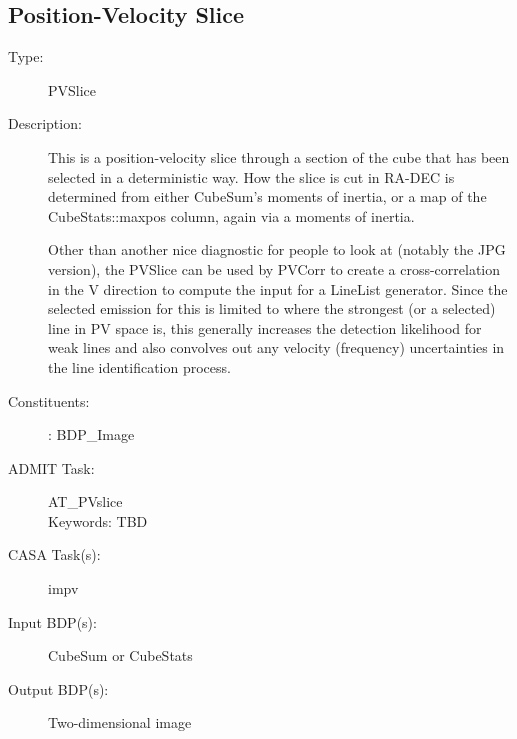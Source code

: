 \subsection{Position-Velocity Slice}
\begin{description}
\item[Type:] PVSlice
\item[Description:]

This is a position-velocity slice through a section of the cube that has
been selected in a deterministic way.  How the slice is cut in RA-DEC
is determined from either CubeSum's moments of inertia, or a map of the
CubeStats::maxpos column, again via a moments of inertia.

Other than another nice diagnostic for people to look at (notably the JPG
version), the PVSlice can be used by PVCorr to create a cross-correlation
in the V direction to compute the input for a LineList generator. Since
the selected emission for this is limited to where the strongest (or 
a selected) line in PV space is, this generally increases the detection
likelihood for weak lines and also convolves out any velocity (frequency)
uncertainties in the line identification process.

\item[Constituents:]: BDP\_Image

\item[ADMIT Task:] AT\_PVslice \\
  Keywords: TBD

\item[CASA Task(s):] impv

\item[Input BDP(s):] CubeSum or CubeStats

\item[Output BDP(s):] Two-dimensional image
\end{description}
 

